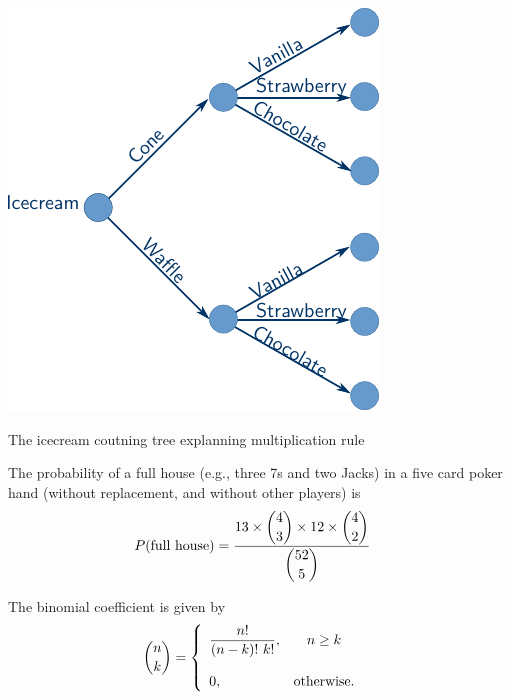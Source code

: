 \begin{multicols}{2}
    \begin{Figure}
        \centering
        \includegraphics[width =
        0.9\linewidth]{./Graphics/MultiplicationRule.pdf}
        \caption{The icecream coutning tree explanning multiplication rule}
        \label{fig2}
    \end{Figure}

    \begin{example}
        The probability of a full house (e.g., three 7s and two Jacks) in a five
        card poker hand (without replacement, and without other players) is
        \begin{align}
            P(\text{full house}) &= \dfrac{13\times \dbinom{4}{3}\times 12\times
            \dbinom{4}{2}}{\dbinom{52}{5}}
        \end{align}
    \end{example}

    \begin{definition}
        The binomial coefficient is given by
        \begin{align}
            \dbinom{n}{k} &= \left\{
            \begin{array}{lc}
                \dfrac{n!}{(n-k)!\ k!}, & n\ge k\\\\
                0, & \text{otherwise.}
            \end{array}
            \right.
        \end{align}
    \end{definition}


\end{multicols}
